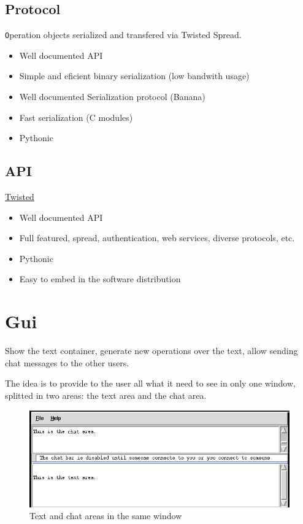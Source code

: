 \documentclass{article}
\begin{document}
\subsection{Protocol}

{\texttt Operation} objects serialized and transfered via Twisted Spread.

\begin{itemize}
\item Well documented API
\item Simple and eficient binary serialization (low bandwith usage)
\item Well documented Serialization protocol (Banana)
\item Fast serialization (C modules)
\item Pythonic
\end{itemize}

\subsection{API}
  
\href{http://www.twistedmatrix.com}{Twisted}

\begin{itemize}
\item Well documented API
\item Full featured, spread, authentication, web services, diverse protocols, etc.
\item Pythonic
\item Easy to embed in the software distribution
\end{itemize}
\section{Gui}

Show the text container, generate new operations over the text, allow sending chat messages to the other users.

The idea is to provide to the user all what it need to see in only one window, splitted in two areas: the text area and the chat area.

\begin{figure}[htbp]
 \begin{center}
    \includegraphics[angle=0,width=0.5\linewidth]{schemas/text_and_chat_area.png}
 \end{center}
 \label{fig:textandchatarea}
 \caption{Text and chat areas in the same window}
\end{figure}
\end{document}
